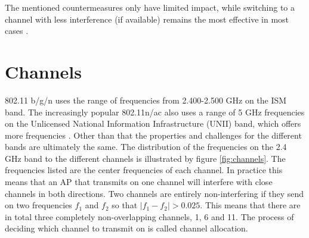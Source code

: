 	The mentioned countermeasures only have limited
	impact, while switching to a channel with less interference (if available) remains the most effective in most cases \cite{impactRF}. 
	\section{Channels} 
	802.11 b/g/n uses the range of frequencies from 2.400-2.500 GHz on the ISM band.
	The increasingly popular 802.11n/ac also uses a range of 5 GHz frequencies on the Unlicensed
	National Information Infrastructure (UNII) band, which offers more frequencies \cite{5ghz}.
	Other than that the properties and challenges for the different bands are ultimately the same.
	The distribution of the frequencies on the 2.4 GHz band to the different channels is illustrated by figure \ref{fig:channels}. The frequencies listed are the center frequencies of each channel. In practice this means that an AP that transmits on one channel will interfere with close channels in both directions. Two channels are entirely non-interfering if they send on two frequencies  $f_{1}$ and $f_{2}$ so that $|f_{1} - f_{2}| > 0.025$. This means that there are in total three completely non-overlapping channels, 1, 6 and 11. The process of deciding which channel to transmit on is called channel allocation. 




